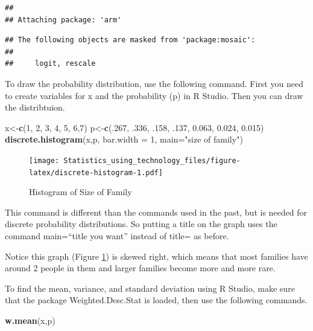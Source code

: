 \documentclass[
]{book}
\newenvironment{Shaded}{\begin{snugshade}}{\end{snugshade}}
\newcommand{\DataTypeTok}[1]{\textcolor[rgb]{0.13,0.29,0.53}{#1}}
\newcommand{\DecValTok}[1]{\textcolor[rgb]{0.00,0.00,0.81}{#1}}
\newcommand{\FloatTok}[1]{\textcolor[rgb]{0.00,0.00,0.81}{#1}}
\newcommand{\KeywordTok}[1]{\textcolor[rgb]{0.13,0.29,0.53}{\textbf{#1}}}
\newcommand{\NormalTok}[1]{#1}
\newcommand{\StringTok}[1]{\textcolor[rgb]{0.31,0.60,0.02}{#1}}
\begin{document}
\begin{verbatim}
## 
## Attaching package: 'arm'
\end{verbatim}

\begin{verbatim}
## The following objects are masked from 'package:mosaic':
## 
##     logit, rescale
\end{verbatim}

To draw the probability distribution, use the following command. First you need to create variables for x and the probability (p) in R Studio. Then you can draw the distribtuion.



\begin{Shaded}
\begin{Highlighting}[]
\NormalTok{x<-}\KeywordTok{c}\NormalTok{(}\DecValTok{1}\NormalTok{, }\DecValTok{2}\NormalTok{, }\DecValTok{3}\NormalTok{, }\DecValTok{4}\NormalTok{, }\DecValTok{5}\NormalTok{, }\DecValTok{6}\NormalTok{,}\DecValTok{7}\NormalTok{)}
\NormalTok{p<-}\KeywordTok{c}\NormalTok{(.}\DecValTok{267}\NormalTok{, }\FloatTok{.336}\NormalTok{, }\FloatTok{.158}\NormalTok{, }\FloatTok{.137}\NormalTok{, }\FloatTok{0.063}\NormalTok{, }\FloatTok{0.024}\NormalTok{, }\FloatTok{0.015}\NormalTok{)}
\KeywordTok{discrete.histogram}\NormalTok{(x,p, }\DataTypeTok{bar.width =} \DecValTok{1}\NormalTok{, }\DataTypeTok{main=}\StringTok{"size of family"}\NormalTok{)}
\end{Highlighting}
\end{Shaded}

\begin{figure}
\centering
\texttt{[image: Statistics\_using\_technology\_files/figure-latex/discrete-histogram-1.pdf]}
\caption{\label{fig:discrete-histogram}Histogram of Size of Family}
\end{figure}

This command is different than the commands used in the past, but is needed for discrete probability distributions. So putting a title on the graph uses the command main=``title you want'' instead of title= as before.

Notice this graph (Figure \ref{fig:discrete-histogram}) is skewed right, which means that most families have around 2 people in them and larger families become more and more rare.

To find the mean, variance, and standard deviation using R Studio, make sure that the package Weighted.Desc.Stat is loaded, then use the following commands.

\begin{Shaded}
\begin{Highlighting}[]
\KeywordTok{w.mean}\NormalTok{(x,p)}
\end{Highlighting}
\end{Shaded}
\end{document}
